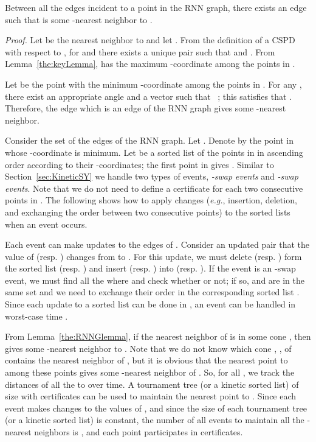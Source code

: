 \documentclass[11pt]{llncs}
\newcommand{\eg}{\emph{e.g.}}
\renewenvironment{proof}{\emph{Proof.}}{\hfill  \medskip\\}
\begin{document}
\begin{lemma}\label{the:RNNGlemma}
Between all the edges incident to a point  in the RNN graph, there exists an edge  such that  is some -nearest neighbor to .
\end{lemma}
\begin{proof}
Let  be the nearest neighbor to  and let . From the definition of a CSPD with respect to , for  and  there exists a unique pair  such that  and . From Lemma~\ref{the:keyLemma},  has the maximum -coordinate among the points in . 

Let  be the point with the minimum -coordinate among the points in . For any , there exist an appropriate angle  and a vector  such that ~\cite{Abam:2011:KSX:1971362.1971367}; this satisfies that . Therefore, the edge  which is an edge of the RNN graph gives some -nearest neighbor.
\end{proof}


Consider the set  of the edges of the RNN graph. Let . Denote by  the point in  whose -coordinate is minimum. Let  be a sorted list of the points in  in ascending order according to their -coordinates; the first point in  gives . Similar to Section~\ref{sec:KineticSY} we handle two types of events, \textit{-swap events} and \textit{-swap events}. Note that we do not need to define a certificate for each two consecutive points in .  The following shows how to apply changes (\eg, insertion, deletion, and exchanging the order between two consecutive points) to the sorted lists  when an event occurs.

Each event can make  updates to the edges of . Consider an updated pair  that the value of  (resp. ) changes from  to . For this update, we must delete  (resp. ) form the sorted list  (resp. ) and insert  (resp. ) into  (resp. ). If the event is an -swap event, we must find all the  where  and check whether  or not; if so,  and  are in the same set  and we need to exchange their order in the corresponding sorted list . Since each update to a sorted list  can be done in , an event can be handled in worst-case time .



From Lemma~\ref{the:RNNGlemma}, if the nearest neighbor of  is in some cone , then  gives some -nearest neighbor to . Note that we do not know which cone , , of  contains the nearest neighbor of , but it is obvious that the nearest point to  among these  points  gives some -nearest neighbor of . So, for all , we track the distances of all the  to  over time. A tournament tree (or a kinetic sorted list) of size  with  certificates can be used to maintain the nearest point to . Since each event makes  changes to the values of , and since the size of each tournament tree (or a kinetic sorted list) is constant, the number of all events to maintain all the -nearest neighbors is , and each point participates in  certificates.
\end{document}
